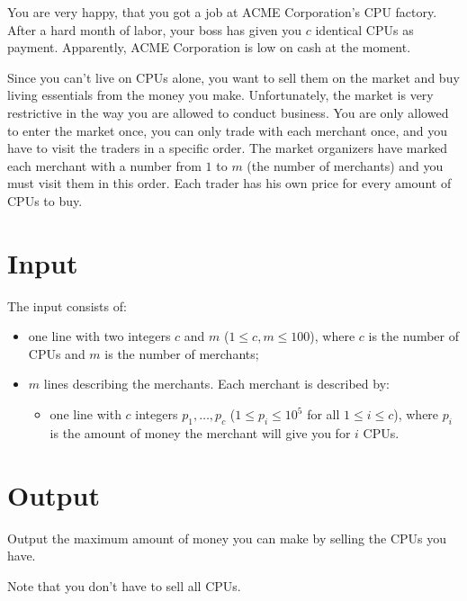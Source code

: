 
You are very happy, that you got a job at ACME Corporation's CPU factory.
After a hard month of labor, your boss has given you $c$ identical CPUs as payment.
Apparently, ACME Corporation is low on cash at the moment.

Since you can't live on CPUs alone, you want to sell them on the market and buy living essentials from the money you make.
Unfortunately, the market is very restrictive in the way you are allowed to conduct business.
You are only allowed to enter the market once, you can only trade with each merchant once, and you have to visit the traders in a specific order.
The market organizers have marked each merchant with a number from $1$ to $m$ (the number of merchants) and you must visit them in this order.
Each trader has his own price for every amount of CPUs to buy.

\section*{Input}

The input consists of:
\begin{itemize}
\item one line with two integers $c$ and $m$ ($1 \leq c,m \leq 100$), where $c$ is the number of CPUs and $m$ is the number of merchants;
\item $m$ lines describing the merchants. Each merchant is described by:
\begin{itemize}
\item one line with $c$ integers $p_1, \dots, p_c$ ($1 \leq p_i \leq 10^5$ for all $1\leq i\leq c$), where $p_i$ is the amount of money the merchant will give you for $i$ CPUs.
\end{itemize}
\end{itemize}

\section*{Output}

Output the maximum amount of money you can make by selling the CPUs you have.

Note that you don't have to sell all CPUs.
